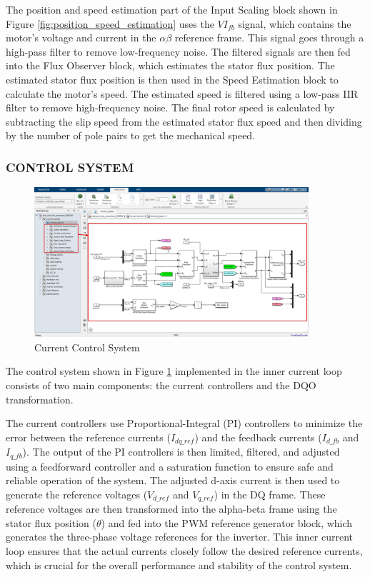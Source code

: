 The position and speed estimation part of the Input Scaling block shown in  Figure \ref{fig:position_speed_estimation} uses the $VI_{fb}$ signal, which contains the motor's voltage and current in the $\alpha \beta$ reference frame. This signal goes through a high-pass filter to remove low-frequency noise. The filtered signals are then fed into the Flux Observer block, which estimates the stator flux position. The estimated stator flux position is then used in the Speed Estimation block to calculate the motor's speed. The estimated speed is filtered using a low-pass IIR filter to remove high-frequency noise. The final rotor speed is calculated by subtracting the slip speed from the estimated stator flux speed and then dividing by the number of pole pairs to get the mechanical speed.

\subsubsection{CONTROL SYSTEM}



\begin{figure}[H]
	\centering
	\includegraphics[width=4in]{sections/section3/images/simulation/currentControl/controlSystem.png}
	\caption{Current Control System}
	\label{fig:current_control_system}
\end{figure}


The control system shown in Figure \ref{fig:current_control_system} implemented in the inner current loop consists of two main components: the current controllers and the DQO transformation.

The current controllers use Proportional-Integral (PI) controllers to minimize the error between the reference currents ($I_{dq\_{ref}}$) and the feedback currents ($I_{d\_fb}$ and $I_{q\_fb}$). The output of the PI controllers is then limited, filtered, and adjusted using a feedforward controller and a saturation function to ensure safe and reliable operation of the system. The adjusted d-axis current is then used to generate the reference voltages ($V_{d\_{ref}}$ and $V_{q\_{ref}}$) in the DQ frame. These reference voltages are then transformed into the alpha-beta frame using the stator flux position ($\theta$) and fed into the PWM reference generator block, which generates the three-phase voltage references for the inverter. This inner current loop ensures that the actual currents closely follow the desired reference currents, which is crucial for the overall performance and stability of the control system.



